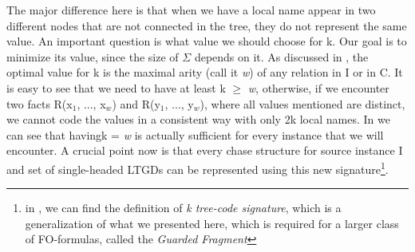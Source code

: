 \documentclass[11pt, a4paper, dvipsnames]{article}
\begin{document}
The major difference here is that when we have a local name appear in two different nodes that are not connected in the tree, they do not represent the same value.\newline
An important question is what value we should choose for k. Our goal is to minimize its value, since the size of $\Sigma$ depends on it. As discussed in \cite{decidable}, the optimal value for k is the maximal arity (call it \textit{w}) of any relation in I or in C.\newline
It is easy to see that we need to have at least k $\geq$ \textit{w}, otherwise, if we encounter two facts R(x$_{1}$, ..., x$_{w}$) and R(y$_{1}$, ..., y$_{w}$), where all values mentioned are distinct, we cannot code the values in a consistent way with only 2k local names. In \cite{decidable} we can see that having\newline k = \textit{w} is actually sufficient for every instance that we will encounter.\newline
A crucial point now is that every chase structure for source instance I and set of single-headed LTGDs can be represented using this new signature\footnote{in \cite{decidable}, we can find the definition of \textit{k tree-code signature}, which is a generalization of what we presented here, which is required for a larger class of FO-formulas, called the \textit{Guarded Fragment}}. 
\end{document}
